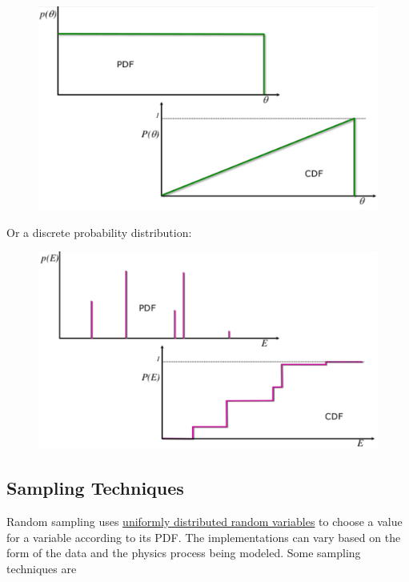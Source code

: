 \documentclass[12pt]{article}
\begin{document}
\begin{figure}[h!]
\begin{center}
\includegraphics[scale=0.55]{../figs/pdf-cdf.png}
\end{center}
\end{figure}

Or a discrete probability distribution:

\begin{figure}[h!]
\begin{center}
\includegraphics[scale=0.55]{../figs/discretePDF-CDF.png}
\end{center}
\end{figure}


\subsection*{Sampling Techniques}

Random sampling uses \underline{uniformly distributed random variables} to choose a value for a variable according to its PDF.  
The implementations can vary based on the form of the data and the physics process being modeled.
Some sampling techniques are
\end{document}
